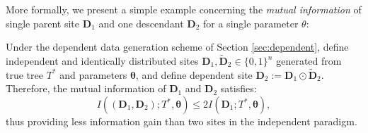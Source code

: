 More formally, we present a simple example concerning the \textit{mutual information} of single parent site $\mathbf{D}_1$ and one descendant  $\mathbf{D}_2$ for a single parameter $\theta$:
\begin{proposition} 
\label{prop:information}
Under the dependent data generation scheme of Section \ref{sec:dependent}, define independent and identically distributed sites $\mathbf{D}_1, \tilde{\mathbf{D}}_2 \in \{0, 1\}^n$ generated from true tree $T^*$ and parameters $\boldsymbol{\theta}$, and define dependent site $\mathbf{D}_2 := \mathbf{D}_1 \odot 
\tilde{\mathbf{D}}_2$. Therefore, the mutual information of $\mathbf{D}_1$ and $\mathbf{D}_2$ satisfies:
\begin{equation}
\label{eq:dependentinformation}
    I((\mathbf{D}_1, \mathbf{D}_2); T^*, \boldsymbol{\theta}) \leq 2I(\mathbf{D}_1; T^*, \boldsymbol{\theta}),
\end{equation}
thus providing less information gain than two sites in the independent paradigm.
\end{proposition}
